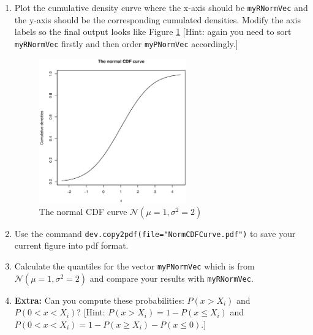 \documentclass[a4paper]{article}
\begin{document}
\begin{enumerate}
  \item Plot the cumulative density curve where the x-axis should be
    \texttt{myRNormVec} and the y-axis should be the corresponding cumulated
    densities. Modify the axis labels so the final output looks like Figure
    \ref{fig:normcdfcurve} [Hint: again you need to sort \texttt{myRNormVec}
    firstly and then order \texttt{myPNormVec} accordingly.]

    \begin{figure}
      \centering
      \includegraphics[width=0.6\textwidth]{NormCDFCur.eps}
      \caption{The normal CDF curve $\mathcal{N}(\mu=1,\sigma^2=2)$}
      \label{fig:normcdfcurve}
    \end{figure}
 
  \item Use the command \texttt{dev.copy2pdf(file="NormCDFCurve.pdf")} to save your
    current figure into pdf format.

  \item Calculate the quantiles for the vector \texttt{myPNormVec} which is
    from $\mathcal{N}(\mu=1,\sigma^2=2)$ and compare your results with
    \texttt{myRNormVec}.

  \item \textbf{Extra:} Can you compute these probabilities: $P(x>X_i)$ and
    $P(0<x<X_i)$? [Hint: $P(x>X_i) = 1 - P(x \leq X_i)$ and $P(0<x<X_i)= 1- P(x
    \geq X_i)- P(x \leq 0)$.] 
  \end{enumerate}
\end{document}
